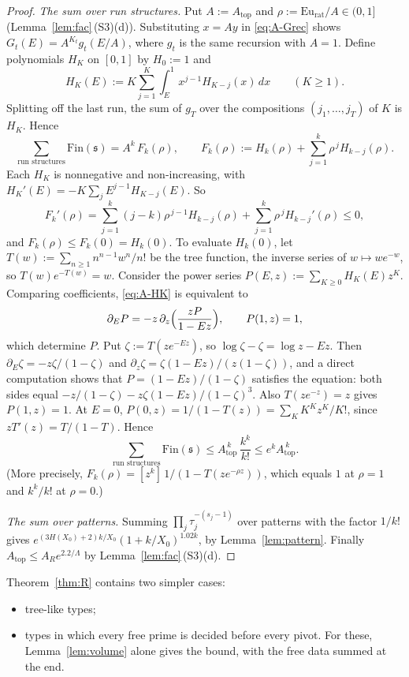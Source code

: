 \begin{proof}
\emph{The sum over run structures.} Put $A:=A_{\mathrm{top}}$ and $\rho:=\mathrm{Eu}_{\mathrm{rat}}/A\in(0,1]$
(Lemma~\ref{lem:fac}\,(S3)(d)). Substituting $x=Ay$ in \eqref{eq:A-Grec} shows $G_t(E)=A^{K_t}g_t(E/A)$, where $g_t$
is the same recursion with $A=1$. Define polynomials $H_K$ on $[0,1]$ by $H_0:=1$ and
\begin{equation}\label{eq:A-HK}
  H_K(E):=K\sum_{j=1}^{K}\int_E^1x^{j-1}H_{K-j}(x)\,dx\qquad(K\ge1).
\end{equation}
Splitting off the last run, the sum of $g_T$ over the compositions $(j_1,\dots,j_T)$ of $K$ is $H_K$. Hence
\[
  \sum_{\text{run structures}}\mathrm{Fin}(\mathfrak s)=A^k\,F_k(\rho),\qquad
  F_k(\rho):=H_k(\rho)+\sum_{j=1}^{k}\rho^{\,j}H_{k-j}(\rho).
\]
Each $H_K$ is nonnegative and non-increasing, with $H_K'(E)=-K\sum_{j}E^{j-1}H_{K-j}(E)$. So
\[
  F_k'(\rho)=\sum_{j=1}^{k}(j-k)\rho^{\,j-1}H_{k-j}(\rho)+\sum_{j=1}^{k}\rho^{\,j}H_{k-j}'(\rho)\le0,
\]
and $F_k(\rho)\le F_k(0)=H_k(0)$. To evaluate $H_k(0)$, let $T(w):=\sum_{n\ge1}n^{n-1}w^n/n!$ be the tree function, the
inverse series of $w\mapsto we^{-w}$, so $T(w)e^{-T(w)}=w$. Consider the power series $P(E,z):=\sum_{K\ge0}H_K(E)z^K$.
Comparing coefficients, \eqref{eq:A-HK} is equivalent to
\[
  \partial_EP=-z\,\partial_z\Bigl(\frac{zP}{1-Ez}\Bigr),\qquad P(1,z)=1,
\]
which determine $P$. Put $\zeta:=T(ze^{-Ez})$, so $\log\zeta-\zeta=\log z-Ez$. Then $\partial_E\zeta=-z\zeta/(1-\zeta)$
and $\partial_z\zeta=\zeta(1-Ez)/(z(1-\zeta))$, and a direct computation shows that $P=(1-Ez)/(1-\zeta)$ satisfies the
equation: both sides equal $-z/(1-\zeta)-z\zeta(1-Ez)/(1-\zeta)^3$. Also $T(ze^{-z})=z$ gives $P(1,z)=1$. At $E=0$,
$P(0,z)=1/(1-T(z))=\sum_KK^Kz^K/K!$, since $zT'(z)=T/(1-T)$. Hence
\[
  \sum_{\text{run structures}}\mathrm{Fin}(\mathfrak s)\le A_{\mathrm{top}}^{\,k}\,\frac{k^k}{k!}\le e^k A_{\mathrm{top}}^{\,k}.
\]
(More precisely, $F_k(\rho)=[z^k]\,1/(1-T(ze^{-\rho z}))$, which equals $1$ at $\rho=1$ and $k^k/k!$ at $\rho=0$.)

\emph{The sum over patterns.} Summing $\prod_j\tau_j^{-(s_j-1)}$ over patterns with the factor $1/k!$ gives
$e^{(3H(X_0)+2)k/X_0}(1+k/X_0)^{1.02k}$, by Lemma~\ref{lem:pattern}. Finally $A_{\mathrm{top}}\le A_Re^{2.2/\Lambda}$ by
Lemma~\ref{lem:fac}\,(S3)(d).
\end{proof}

\begin{remark}
Theorem~\ref{thm:R} contains two simpler cases:
\begin{itemize}
\item tree-like types;
\item types in which every free prime is decided before every pivot. For these, Lemma~\ref{lem:volume} alone gives the
  bound, with the free data summed at the end.
\end{itemize}
\end{remark}

